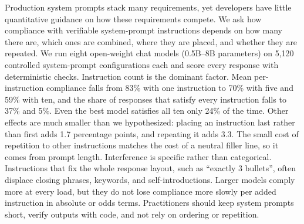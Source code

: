 Production system prompts stack many requirements, yet developers have little quantitative guidance on how these requirements compete. We ask how compliance with verifiable system-prompt instructions depends on how many there are, which ones are combined, where they are placed, and whether they are repeated. We run eight open-weight chat models (0.5B--8B parameters) on 5,120 controlled system-prompt configurations each and score every response with deterministic checks. Instruction count is the dominant factor. Mean per-instruction compliance falls from 83\% with one instruction to 70\% with five and 59\% with ten, and the share of responses that satisfy every instruction falls to 37\% and 5\%. Even the best model satisfies all ten only 24\% of the time. Other effects are much smaller than we hypothesized: placing an instruction last rather than first adds 1.7 percentage points, and repeating it adds 3.3. The small cost of repetition to other instructions matches the cost of a neutral filler line, so it comes from prompt length. Interference is specific rather than categorical. Instructions that fix the whole response layout, such as ``exactly 3 bullets'', often displace closing phrases, keywords, and self-introductions. Larger models comply more at every load, but they do not lose compliance more slowly per added instruction in absolute or odds terms. Practitioners should keep system prompts short, verify outputs with code, and not rely on ordering or repetition.
